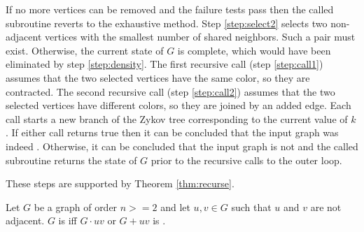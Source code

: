 If no more vertices can be removed and the failure tests pass then the called subroutine reverts to the exhaustive
method.  Step \ref{step:select2} selects two non-adjacent vertices with the smallest number of shared neighbors.
Such a pair must exist.  Otherwise, the current state of \(G\) is complete, which would have been eliminated by
step \ref{step:density}.  The first recursive call (step \ref{step:call1}) assumes that the two selected vertices
have the same color, so they are contracted.  The second recursive call (step \ref{step:call2}) assumes that the
two selected vertices have different colors, so they are joined by an added edge.  Each call starts a new branch of
the Zykov tree corresponding to the current value of \(k\).  If either call returns true then it can be concluded
that the input graph was indeed .  Otherwise, it can be concluded that the input graph is not
 and the called subroutine returns the state of \(G\) prior to the recursive calls to the outer loop.

These steps are supported by Theorem \ref{thm:recurse}.

\begin{theorem}
  \label{thm:recurse}
  Let \(G\) be a graph of order \(n>=2\) and let \(u,v\in G\) such that \(u\) and \(v\) are not adjacent.  \(G\) is
   iff \(G\cdot uv\) or \(G+uv\) is .
\end{theorem}

